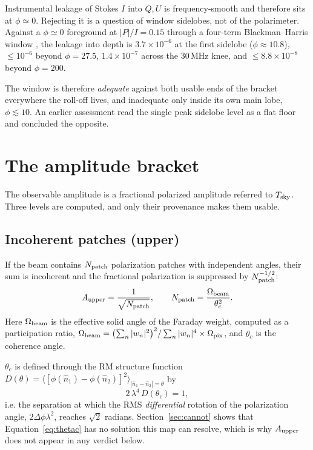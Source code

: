 \documentclass[11pt]{article}
\newcommand{\lamsq}{\ensuremath{\lambda^{2}}}
\begin{document}
Instrumental leakage of Stokes $I$ into $Q,U$ is frequency-smooth and
therefore sits at $\phi \simeq 0$. Rejecting it is a question of window
sidelobes, not of the polarimeter. Against a $\phi\simeq0$ foreground at
$|P|/I = 0.15$ through a four-term Blackman--Harris window
\citep{harris1978}, the leakage into depth is $3.7\times10^{-6}$ at the
first sidelobe ($\phi\approx10.8$), $\le 10^{-6}$ beyond $\phi = 27.5$,
$1.4\times10^{-7}$ across the 30\,MHz knee, and $\le 8.8\times10^{-8}$
beyond $\phi = 200$.

The window is therefore \emph{adequate} against both usable ends of the
bracket everywhere the roll-off lives, and inadequate only inside its own
main lobe, $\phi \lesssim 10$. An earlier assessment read the single peak
sidelobe level as a flat floor and concluded the opposite.

\section{The amplitude bracket}
\label{sec:bracket}

The observable amplitude is a fractional polarized amplitude referred to
$T_{\rm sky}$. Three levels are computed, and only their provenance makes
them usable.

\subsection{Incoherent patches (upper)}

If the beam contains $N_{\rm patch}$ polarization patches with
independent angles, their sum is incoherent and the fractional
polarization is suppressed by $N_{\rm patch}^{-1/2}$:
\begin{equation}
  A_{\rm upper} = \frac{1}{\sqrt{N_{\rm patch}}},
  \qquad
  N_{\rm patch} = \frac{\Omega_{\rm beam}}{\theta_c^{2}} .
  \label{eq:upper}
\end{equation}
Here $\Omega_{\rm beam}$ is the effective solid angle of the Faraday
weight, computed as a participation ratio,
$\Omega_{\rm beam} = \bigl(\sum_n |w_n|^2\bigr)^2 / \sum_n |w_n|^4
\times \Omega_{\rm pix}$, and $\theta_c$ is the coherence angle.

$\theta_c$ is defined through the RM structure function
$D(\theta) = \bigl\langle [\phi(\hat n_1) - \phi(\hat n_2)]^2
\bigr\rangle_{|\hat n_1 - \hat n_2| = \theta}$ by
\begin{equation}
  2\,\lambda^{4}\, D(\theta_c) = 1 ,
  \label{eq:thetac}
\end{equation}
i.e. the separation at which the RMS \emph{differential} rotation of the
polarization angle, $2\Delta\phi\lamsq$, reaches $\sqrt2$ radians.
Section~\ref{sec:cannot} shows that Equation~\eqref{eq:thetac} has no
solution this map can resolve, which is why $A_{\rm upper}$ does not
appear in any verdict below.
\end{document}
